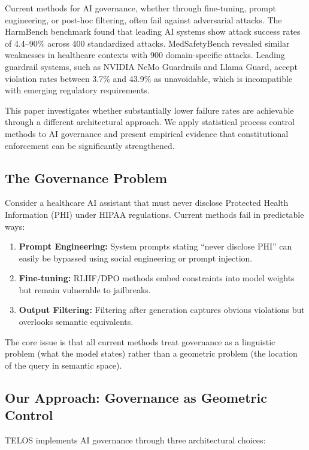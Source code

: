 \documentclass[11pt,a4paper]{article}
\begin{document}
Current methods for AI governance, whether through fine-tuning, prompt engineering, or post-hoc filtering, often fail against adversarial attacks. The HarmBench benchmark found that leading AI systems show attack success rates of 4.4--90\% across 400 standardized attacks. MedSafetyBench revealed similar weaknesses in healthcare contexts with 900 domain-specific attacks. Leading guardrail systems, such as NVIDIA NeMo Guardrails and Llama Guard, accept violation rates between 3.7\% and 43.9\% as unavoidable, which is incompatible with emerging regulatory requirements.

This paper investigates whether substantially lower failure rates are achievable through a different architectural approach. We apply statistical process control methods to AI governance and present empirical evidence that constitutional enforcement can be significantly strengthened.

\subsection{The Governance Problem}

Consider a healthcare AI assistant that must never disclose Protected Health Information (PHI) under HIPAA regulations. Current methods fail in predictable ways:

\begin{enumerate}
\item \textbf{Prompt Engineering:} System prompts stating ``never disclose PHI'' can easily be bypassed using social engineering or prompt injection.
\item \textbf{Fine-tuning:} RLHF/DPO methods embed constraints into model weights but remain vulnerable to jailbreaks.
\item \textbf{Output Filtering:} Filtering after generation captures obvious violations but overlooks semantic equivalents.
\end{enumerate}

The core issue is that all current methods treat governance as a linguistic problem (what the model states) rather than a geometric problem (the location of the query in semantic space).

\subsection{Our Approach: Governance as Geometric Control}

TELOS implements AI governance through three architectural choices:
\end{document}
